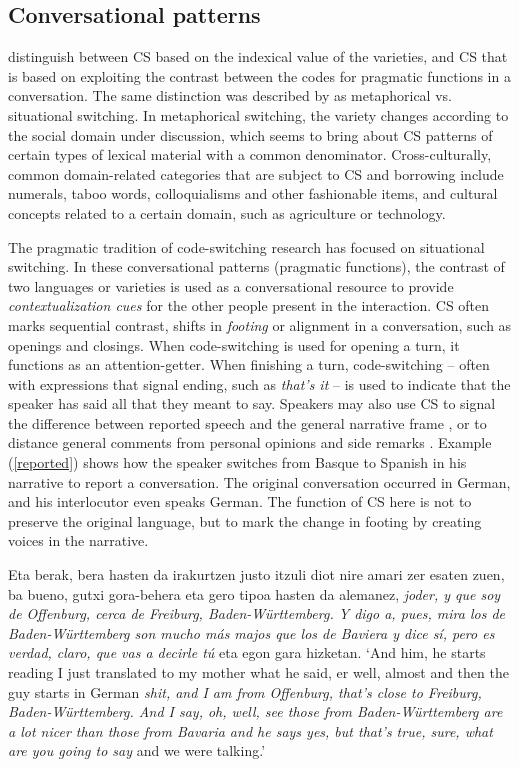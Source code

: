 \documentclass[output=paper]{langscibook}
\begin{document}
\subsection{Conversational patterns} 
\textcite{milroy2003sociolinguistics} distinguish between CS based on the indexical value of the varieties, and CS that is based on exploiting the contrast between the codes for pragmatic functions in a conversation. The same distinction was described by \textcite{blom1972directions} as metaphorical vs. situational switching. In metaphorical switching, the variety changes according to the social domain under discussion, which seems to bring about CS patterns of certain types of lexical material with a common denominator. Cross-culturally, common domain-related categories that are subject to CS and borrowing include numerals, taboo words, colloquialisms and other fashionable items, and cultural concepts related to a certain domain, such as agriculture or technology.

The pragmatic tradition of code-switching research has focused on situational switching. In these conversational patterns (pragmatic functions), the contrast of two languages or varieties is used as a conversational resource to provide \textit{contextualization cues} \parencite{gumperz1982discourse} for the other people present in the interaction. CS often marks sequential contrast, shifts in \textit{footing} \parencite{goffman1981forms} or alignment in a conversation, such as openings and closings.  When code-switching is used for opening a turn, it functions as an attention-getter. When finishing a turn, code-switching – often with expressions that signal ending, such as \textit{that’s it} – is used to indicate that the speaker has said all that they meant to say. Speakers may also use CS to signal the difference between reported speech and the general narrative frame \parencite{alfonzetti1998conversational}, or to distance general comments from personal opinions and side remarks \parencite{gumperz1982discourse}. Example (\ref{reported}) shows how the speaker switches from Basque to Spanish in his narrative to report a conversation. The original conversation occurred in German, and his interlocutor even speaks German. The function of CS here is not to preserve the original language, but to mark the change in footing by creating voices in the narrative.

\begin{exe}
\ex\label{reported} Eta berak, bera hasten da irakurtzen justo itzuli diot nire amari zer esaten zuen, ba bueno, gutxi gora-behera eta gero tipoa hasten da alemanez, \textit{joder, y que soy de Offenburg, cerca de Freiburg, Baden-Württemberg.  Y digo a, pues, mira los de Baden-Württemberg son mucho más majos que los de Baviera y dice sí, pero es verdad, claro, que vas a decirle  tú} eta egon gara hizketan.
\glt `And him, he starts reading I just translated to my mother what he said, er well, almost and then the guy starts in German \textit{shit, and I am from Offenburg, that’s close to Freiburg, Baden-Württemberg. And I say, oh, well, see those from Baden-Württemberg are a lot nicer than those from Bavaria and he says yes, but that’s true, sure, what are you going to say} and we were talking.'
\end{exe}
\end{document}
